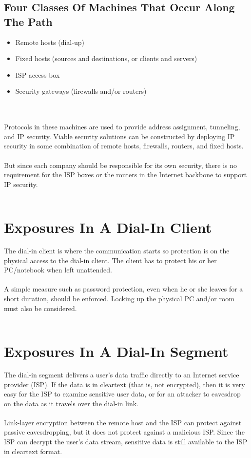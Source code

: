 \documentclass[10pt,a4paper]{article}
\begin{document}
\subsection{Four Classes Of Machines That Occur Along The Path}
\begin{itemize}
\item Remote hosts (dial-up)
\item Fixed hosts (sources and destinations, or clients and servers)
\item ISP access box
\item Security gateways (firewalls and/or routers)
\end{itemize}
\\
\\
Protocols in these machines are used to provide address assignment, tunneling,
and IP security. Viable security solutions can be constructed by deploying IP
security in some combination of remote hosts, firewalls, routers, and fixed hosts.
\\
\\
But since each company should be responsible for its own security, there is no
requirement for the ISP boxes or the routers in the Internet backbone to support
IP security.
\\
\\
\section{Exposures In A Dial-In Client}
The dial-in client is where the communication starts so protection is on the
physical access to the dial-in client. The client has to protect his or her
PC/notebook when left unattended. 
\\
\\
A simple measure such as password
protection, even when he or she leaves for a short duration, should be enforced.
Locking up the physical PC and/or room must also be considered.
\\
\\
\section{Exposures In A Dial-In Segment}
The dial-in segment delivers a user's data traffic directly to an Internet
service provider (ISP). If the data is in cleartext (that is, not encrypted), then it is very easy for the ISP to examine sensitive user data, or for an attacker to
eavesdrop on the data as it travels over the dial-in link.
\\
\\
Link-layer encryption between the remote host and the ISP can protect against
passive eavesdropping, but it does not protect against a malicious ISP. Since the
ISP can decrypt the user's data stream, sensitive data is still available to the ISP
in cleartext format.
\end{document}

